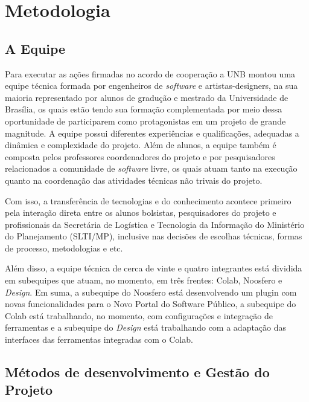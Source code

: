 ﻿\section{Metodologia}
\label{sec:metodologia}

\subsection{A Equipe}
\label{sec:equipe}
Para executar as ações firmadas no acordo de cooperação a UNB montou uma equipe técnica formada por engenheiros de \textit{software} e artistas-designers, na sua maioria representado por alunos de gradução e mestrado da Universidade de Brasília, os quais estão tendo sua formação complementada por meio dessa oportunidade de participarem como protagonistas em um projeto de grande magnitude.
A equipe possui diferentes experiências e qualificações, adequadas a dinâmica e complexidade do projeto. Além de alunos, a equipe também é composta pelos professores coordenadores do projeto e por pesquisadores relacionados a comunidade de \textit{software} livre, os quais atuam tanto na execução quanto na coordenação das 
atividades técnicas não trivais do projeto.

Com isso, a transferência de tecnologias e do conhecimento acontece primeiro pela interação direta entre
os alunos bolsistas, pesquisadores do projeto e profissionais da Secretária de Logística e Tecnologia da Informação do Ministério do Planejamento (SLTI/MP), inclusive nas decisões de escolhas
técnicas, formas de processo, metodologias e etc. 

Além disso, a equipe técnica de cerca de vinte e quatro integrantes está dividida em subequipes que atuam, no momento, em três frentes: Colab, Noosfero e \textit{Design}. Em suma, a subequipe do Noosfero está desenvolvendo um plugin com novas funcionalidades para o Novo Portal do Software Público, a subequipe do Colab está trabalhando, no momento, com configurações e integração de ferramentas e a 
subequipe do \textit{Design} está trabalhando com a adaptação das interfaces das ferramentas integradas com o Colab.


\subsection{Métodos de desenvolvimento e Gestão do Projeto}
\label{sec:metodo-gestao}

